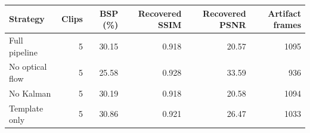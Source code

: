 \begin{tabular}{@{}lrrrrr@{}}
\toprule
\textbf{Strategy} & \textbf{Clips} & \textbf{BSP} (\%) & \textbf{Recovered SSIM} & \textbf{Recovered PSNR} & \textbf{Artifact frames} \\
\midrule
Full pipeline & 5 & 30.15 & 0.918 & 20.57 & 1095 \\
No optical flow & 5 & 25.58 & 0.928 & 33.59 & 936 \\
No Kalman & 5 & 30.19 & 0.918 & 20.58 & 1094 \\
Template only & 5 & 30.86 & 0.921 & 26.47 & 1033 \\
\bottomrule
\end{tabular}
